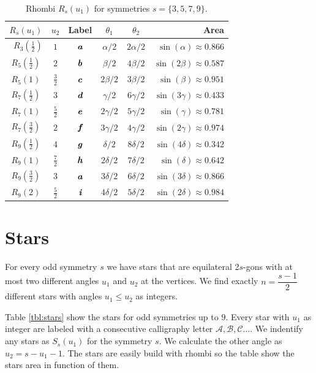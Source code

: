 \documentclass[11pt]{article}
\def\mathbi#1{\textbf{\em #1}}
\begin{document}
\begin{table}[h]
\begin{center}
\begin{tabular}{|c|c|c|c c| r |}
\hline
$R_s(u_1)$ & $u_2$ & Label & $\theta_1$ & $\theta_2$ & Area \\ \hline\
$R_3(\frac{1}2)$ & $1$  & $\mathbi{a}$ & $\alpha/2$ & $2\alpha/2$  & $\sin(\alpha) \approx 0.866$ \\[0.5ex]
\hline
$R_5(\frac{1}2)$ & $2$  & $\mathbi{b}$ & $\beta/2$  & $4\beta/2$   & $\sin(2\beta) \approx 0.587$\\[0.5ex]
$R_5(1)$ & $\frac{3}2$  & $\mathbi{c}$ & $2\beta/2$ & $3\beta/2$   & $\sin(\beta) \approx 0.951$\\[0.5ex]
\hline
$R_7(\frac{1}2)$ & $3$  & $\mathbi{d}$ & $\gamma/2$ & $6\gamma/2$  & $\sin(3\gamma) \approx 0.433$\\[0.5ex]
$R_7(1)$ & $\frac{5}2$ & $\mathbi{e}$ & $2\gamma/2$ & $5\gamma/2$ & $\sin(\gamma) \approx 0.781$\\[0.5ex]
$R_7(\frac{3}2)$ & $2$  & $\mathbi{f}$ & $3\gamma/2$ & $4\gamma/2$ & $\sin(2\gamma) \approx 0.974$\\[0.5ex]
\hline
$R_9(\frac{1}2)$ & $4$ & $\mathbi{g}$ & $\delta/2$ & $8\delta/2$  & $\sin(4\delta) \approx 0.342$\\[0.5ex]
$R_9(1)$ & $\frac{7}2$ & $\mathbi{h}$ & $2\delta/2$ & $7\delta/2$ & $\sin(\delta) \approx 0.642$\\[0.5ex]
$R_9(\frac{3}2)$ & $3$ & $\mathbi{a}$ & $3\delta/2$ & $6\delta/2$ & $\sin(3\delta) \approx 0.866$\\[0.5ex]
$R_9(2)$ & $\frac{5}2$ & $\mathbi{i}$ & $4\delta/2$ & $5\delta/2$ & $\sin(2\delta) \approx 0.984$\\[0.5ex]
\hline
\end{tabular}
\caption{Rhombi $R_s(u_1)$ for symmetries $s=\{3,5,7,9\}$.} 
\label{tbl:rhombi}
\end{center}
\end{table}

\section{Stars}

For every odd symmetry $s$ we have stars that are equilateral 2$s$-gons with at most two different angles $u_1$ and $u_2$ at the vertices. We find exactly $n = \dfrac{s-1}2$ different stars with angles $u_1 \leq u_2$ as integers.

Table \ref{tbl:stars} show the stars for odd symmetries up to $9$. Every star with $u_1$ as integer are labeled with a consecutive calligraphy letter $\mathcal{A}, \mathcal{B}, \mathcal{C}...$. We indentify any stars as $S_s(u_1)$ for the symmetry $s$. We calculate the other angle as $u_2 = s - u_1 - 1$. The stars are easily build with rhombi so the table show the stars area in function of them.
\end{document}
